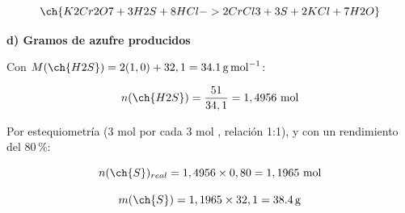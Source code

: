 \begin{exerciseEVAU}
\begin{solu}
        \begin{equation*}
            \ch{K2Cr2O7 + 3 H2S + 8 HCl -> 2 CrCl3 + 3 S + 2 KCl + 7 H2O}
        \end{equation*}

        \textbf{d) Gramos de azufre producidos}

        Con \(M(\ch{H2S}) = 2(1,0)+32,1 = \SI{34.1}{\gram\per\mole}\):

        \begin{equation*}
            n(\ch{H2S}) = \dfrac{51}{34,1} = 1,4956 \ \text{mol}
        \end{equation*}

        Por estequiometría (3 mol  por cada 3 mol , relación 1:1), y con un rendimiento del 80\,\%:

        \begin{equation*}
            n(\ch{S})_{real} = 1,4956 \times 0,80 = 1,1965 \ \text{mol}
        \end{equation*}

        \begin{equation*}
            m(\ch{S}) = 1,1965 \times 32,1 = \SI{38.4}{\gram}
        \end{equation*}

    \end{solu}
\end{exerciseEVAU}


